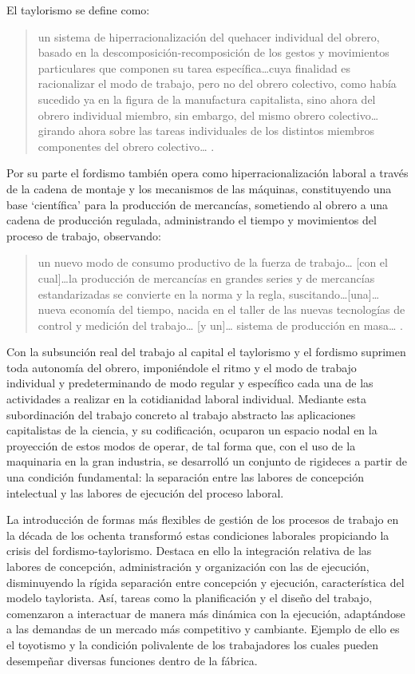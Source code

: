 \documentclass[
  spanish,
  11pt,
  a4paper,
]{scrbook}
\begin{document}
El taylorismo se define como:

\begin{quote}
un sistema de hiperracionalización del quehacer individual del obrero,
basado en la descomposición-recomposición de los gestos y movimientos
particulares que componen su tarea específica\ldots cuya finalidad es
racionalizar el modo de trabajo, pero no del obrero colectivo, como
había sucedido ya en la figura de la manufactura capitalista, sino ahora
del obrero individual miembro, sin embargo, del mismo obrero
colectivo\ldots girando ahora sobre las tareas individuales de los
distintos miembros componentes del obrero colectivo\ldots{}
\autocite[25]{Aguirre2008}.
\end{quote}

Por su parte el fordismo también opera como hiperracionalización laboral
a través de la cadena de montaje y los mecanismos de las máquinas,
constituyendo una base `científica' para la producción de mercancías,
sometiendo al obrero a una cadena de producción regulada, administrando
el tiempo y movimientos del proceso de trabajo, observando:

\begin{quote}
un nuevo modo de consumo productivo de la fuerza de trabajo\ldots{}
{[}con el cual{]}\ldots la producción de mercancías en grandes series y
de mercancías estandarizadas se convierte en la norma y la regla,
suscitando\ldots{[}una{]}\ldots{} nueva economía del tiempo, nacida en
el taller de las nuevas tecnologías de control y medición del
trabajo\ldots{} {[}y un{]}\ldots{} sistema de producción en masa\ldots{}
\autocite[3-4]{Coriat1982}.
\end{quote}

Con la subsunción real del trabajo al capital el taylorismo y el
fordismo suprimen toda autonomía del obrero, imponiéndole el ritmo y el
modo de trabajo individual y predeterminando de modo regular y
específico cada una de las actividades a realizar en la cotidianidad
laboral individual. Mediante esta subordinación del trabajo concreto al
trabajo abstracto las aplicaciones capitalistas de la ciencia, y su
codificación, ocuparon un espacio nodal en la proyección de estos modos
de operar, de tal forma que, con el uso de la maquinaria en la gran
industria, se desarrolló un conjunto de rigideces a partir de una
condición fundamental: la separación entre las labores de concepción
intelectual y las labores de ejecución del proceso laboral.

La introducción de formas más flexibles de gestión de los procesos de
trabajo en la década de los ochenta transformó estas condiciones
laborales propiciando la crisis del fordismo-taylorismo. Destaca en ello
la integración relativa de las labores de concepción, administración y
organización con las de ejecución, disminuyendo la rígida separación
entre concepción y ejecución, característica del modelo taylorista. Así,
tareas como la planificación y el diseño del trabajo, comenzaron a
interactuar de manera más dinámica con la ejecución, adaptándose a las
demandas de un mercado más competitivo y cambiante. Ejemplo de ello es
el toyotismo y la condición polivalente de los trabajadores los cuales
pueden desempeñar diversas funciones dentro de la fábrica.
\end{document}
